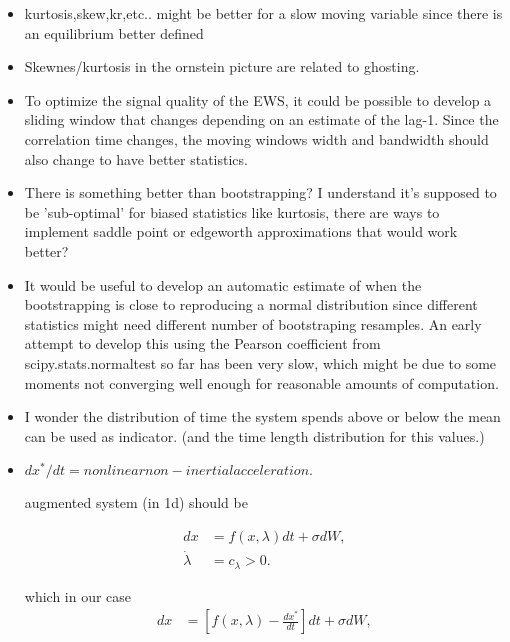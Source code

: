 \begin{itemize}
	\item kurtosis,skew,kr,etc.. might be better for a slow moving variable since there is an equilibrium better defined
			
	\item Skewnes/kurtosis in the ornstein picture are related to ghosting.
		
	\item To optimize the signal quality of the EWS, it could be possible to develop a sliding window that changes depending on an estimate of the lag-1.  Since the correlation time changes, the moving windows width and bandwidth should also change to have better statistics.
	
	\item 	There is something better than bootstrapping? I understand it's supposed to be 'sub-optimal' for biased statistics like kurtosis, there are ways to implement saddle point or edgeworth approximations that would work better?
	
	\item It would be useful to develop an automatic estimate of when the bootstrapping is close to reproducing a normal distribution since different statistics might need different number of bootstraping resamples. 
	An early attempt to develop this using the Pearson coefficient from scipy.stats.normaltest so far has been very slow, which might be due to some moments not converging well enough for reasonable amounts of computation.
	\item I wonder the distribution of time the system spends above or below the mean can be used as indicator. (and the time length distribution for this values.)
	
	
	\item $dx^*/dt=nonlinear non-inertial acceleration.  $
	
	augmented system (in 1d) should be 
	
	\begin{equation}
		\begin{aligned}
			d x&=f(x,\lambda)dt+\sigma dW,\\
			\dot \lambda&= c_\lambda >0.
		\end{aligned}
	\end{equation}
	
	which in our case
	\begin{equation}
		\begin{aligned}
			d x&=[f(x,\lambda)- \frac{d x^*}{dt } ]dt+\sigma dW,\\
		\end{aligned}
	\end{equation}
	

\end{itemize}
